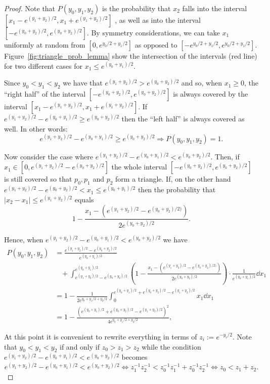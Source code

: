 \begin{proof}
Note that $P(y_0,y_1,y_2)$ is the probability that $x_2$ falls into the interval $[x_1-e^{(y_1+y_2)/2},x_1+e^{(y_1+y_2)/2}]$ , as well as into the interval $[-e^{(y_0+y_2)/2},e^{(y_0+y_2)/2}]$. By symmetry considerations, we can take $x_1$ uniformly at random from $[0,e^{y_0/2+y_1/2}]$ as opposed to $[-e^{y_0/2+y_1/2}, e^{y_0/2+y_1/2}]$. Figure~\ref{fig:triangle_prob_lemma} show the intersection of the intervals (red line) for two different cases for $x_1 \le e^{(y_0 + y_1)/2}$. 

Since $y_0 < y_1 < y_2$ we have that $e^{(y_1+y_2)/2} > e^{(y_0+y_2)/2}$ and so, when $x_1 \geq 0$, the ``right half'' of the 
interval $[-e^{(y_0+y_2)/2}, e^{(y_0+y_2)/2}]$ is always covered by the interval $[x_1-e^{(y_1+y_2)/2}, x_1+e^{(y_1+y_2)/2}]$.
If $e^{(y_1+y_2)/2} - e^{(y_0+y_1)/2} \geq e^{(y_0+y_2)/2}$ then the ``left half'' is always covered as well.
In other words:
\[
	e^{(y_1+y_2)/2} - e^{(y_0+y_1)/2} \geq e^{(y_0+y_2)/2} \Rightarrow P(y_0,y_1,y_2) = 1.
\]

Now consider the case where $e^{(y_1+y_2)/2} - e^{(y_0+y_1)/2} < e^{(y_0+y_2)/2}$. 
Then, if $x_1 \in [0, e^{(y_1+y_2)/2} - e^{(y_0+y_2)/2}]$ the whole interval $[-e^{(y_0+y_2)/2}, e^{(y_0+y_2)/2}]$ is still covered 
so that $p_0, p_1$ and $p_2$ form a triangle. If, on the other hand $e^{(y_1+y_2)/2} - e^{(y_0+y_2)/2} < x_1 \leq e^{(y_0+y_1)/2}$ then
the probability that $|x_2-x_1| \leq e^{(y_1+y_2)/2}$ equals
\[ 
	1 - \frac{x_1 - (e^{(y_1+y_2)/2} - e^{(y_0+y_2)/2)}) }{ 2e^{(y_0+y_2)/2} }. 
\]

Hence, when $e^{(y_1+y_2)/2} - e^{(y_0+y_1)/2} < e^{(y_0+y_2)/2}$ we have
\begin{align*}
	P(y_0,y_1,y_2) &= \frac{e^{(y_1+y_2)/2} - e^{(y_0+y_2)/2} }{ e^{(y_0+y_1)/2} }  \\
	&\hspace{10pt}+ \int_{ e^{(y_1+y_2)/2} - e^{(y_0+y_2)/2} }^{ e^{(y_0+y_1)/2} } 
	    \left(1 - \frac{x_1 - (e^{(y_1+y_2)/2} - e^{(y_0+y_2)/2)}) }{ 2e^{(y_0+y_2)/2} }\right)
	    \cdot \frac{1}{e^{(y_0+y_1)/2}} \dd x_1 \\
	&= 1 - \frac{1}{2e^{y_0+y_1/2+y_2/2} } \int_0^{ e^{(y_0+y_1)/2}+e^{(y_0+y_2)/2}-e^{(y_1+y_2)/2} } x_1 \dd x_1 \\
	&= 1 - \frac{ \left( e^{(y_0+y_1)/2}+e^{(y_0+y_2)/2}-e^{(y_1+y_2)/2} \right)^2 }{ 4 e^{y_0+y_1/2+y_2/2} },
\end{align*}

At this point it is convenient to rewrite everything in terms of $z_i := e^{-y_i/2}$.
Note that $y_0 < y_1 < y_2$ if and only if $z_0 > z_1 > z_2$ while the condition $e^{(y_1+y_2)/2} - e^{(y_0+y_1)/2} < e^{(y_0+y_2)/2}$ becomes
\[ e^{(y_1+y_2)/2} - e^{(y_0+y_1)/2} < e^{(y_0+y_2)/2} \Leftrightarrow 
z_1^{-1} z_2^{-1} < z_0^{-1} z_1^{-1} + z_0^{-1}z_2^{-1} 
\Leftrightarrow
z_0 < z_1+z_2. 
\]


\end{proof}
